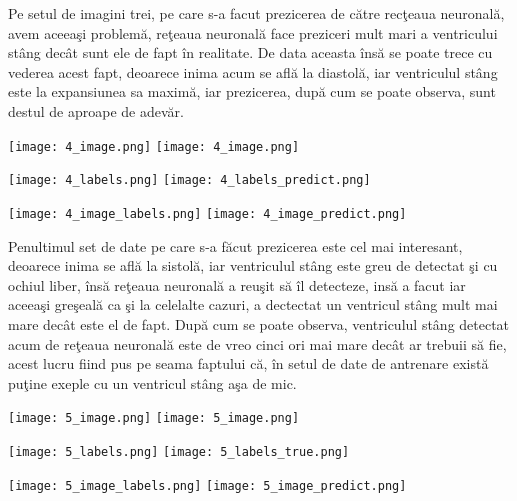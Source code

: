 Pe setul de imagini trei, pe care s-a facut prezicerea de c\u{a}tre rec\c{t}eaua neuronal\u{a}, avem aceea\c{s}i problem\u{a}, re\c{t}eaua neuronal\u{a} face preziceri mult mari a ventricului st\^{a}ng dec\^{a}t sunt ele de fapt \^{i}n realitate. De data aceasta \^{i}ns\u{a} se poate trece cu vederea acest fapt, deoarece inima acum se afl\u{a} la diastol\u{a}, iar ventriculul st\^{a}ng este la expansiunea sa maxim\u{a}, iar prezicerea, dup\u{a} cum se poate observa, sunt destul de aproape de adev\u{a}r.

\begin{center}
\texttt{[image: 4\_image.png]}
\texttt{[image: 4\_image.png]}
\end{center}

\begin{center}
\texttt{[image: 4\_labels.png]}
\texttt{[image: 4\_labels\_predict.png]}
\end{center}

\begin{center}
\texttt{[image: 4\_image\_labels.png]}
\texttt{[image: 4\_image\_predict.png]}
\end{center}

Penultimul set de date pe care s-a f\u{a}cut prezicerea este cel mai interesant, deoarece inima se afl\u{a} la sistol\u{a}, iar ventriculul st\^{a}ng este greu de detectat \c{s}i cu ochiul liber, \^{i}ns\u{a} re\c{t}eaua neuronal\u{a} a reu\c{s}it s\u{a} \^{i}l detecteze, ins\u{a} a facut iar aceea\c{s}i gre\c{s}eal\u{a} ca \c{s}i la celelalte cazuri, a dectectat un ventricul st\^{a}ng mult mai mare dec\^{a}t este el de fapt. Dup\u{a} cum se poate observa, ventriculul st\^{a}ng detectat acum de re\c{t}eaua neuronal\u{a} este de vreo cinci ori mai mare dec\^{a}t ar trebuii s\u{a} fie, acest lucru fiind pus pe seama faptului c\u{a}, \^{i}n setul de date de antrenare exist\u{a} pu\c{t}ine exeple cu un ventricul st\^{a}ng a\c{s}a de mic.

\begin{center}
\texttt{[image: 5\_image.png]}
\texttt{[image: 5\_image.png]}
\end{center}

\begin{center}
\texttt{[image: 5\_labels.png]}
\texttt{[image: 5\_labels\_true.png]}
\end{center}

\begin{center}
\texttt{[image: 5\_image\_labels.png]}
\texttt{[image: 5\_image\_predict.png]}
\end{center}

